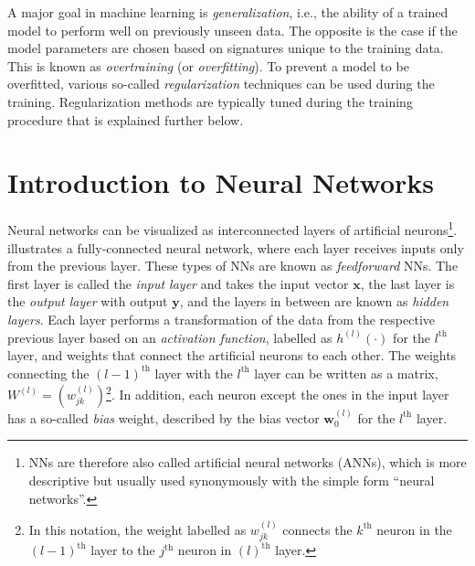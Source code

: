 A major goal in machine learning is \emph{generalization}, i.e., the ability of a trained model to perform well on previously unseen data.
The opposite is the case if the model parameters are chosen based on signatures unique to the training data. This is known as \emph{overtraining} (or \emph{overfitting}). To prevent a model to be overfitted, various so-called \emph{regularization} techniques can be used during the training.
Regularization methods are typically tuned during the training procedure that is explained further below.


\section{Introduction to Neural Networks}
\label{sec:intro-neural-nets}
Neural networks can be visualized as interconnected layers of artificial neurons\footnote{NNs are therefore also called artificial neural networks (ANNs), which is more descriptive but usually used synonymously with the simple form ``neural networks''.}.  illustrates a fully-connected neural network, where each layer receives inputs only from the previous layer. These types of NNs are known as \emph{feedforward} NNs.
The first layer is called the \emph{input layer} and takes the input vector $\pmb{x}$, the last layer is the \emph{output layer} with output $\pmb{y}$, and the layers in between are known as \emph{hidden layers}. 
Each layer performs a transformation of the data from the respective previous layer based on an \emph{activation function}, labelled as $h^{(l)}(\cdot)$ for the $l^\text{th}$ layer, and weights that connect the artificial neurons to each other. The weights connecting the $(l-1)^{\text{th}}$ layer with the $l^{\text{th}}$ layer can be written as a matrix, $W^{(l)} = \left(w^{(l)}_{jk} \right)$\footnote{In this notation, the weight labelled as $w^{(l)}_{jk}$ connects the $k^\text{th}$ neuron in the $(l-1)^\text{th}$ layer to the $j^\text{th}$ neuron in $(l)^\text{th}$ layer.}. In addition, each neuron except the ones in the input layer has a so-called \emph{bias} weight, described by the bias vector $\pmb{w}^{(l)}_0$ for the $l^\text{th}$ layer.
